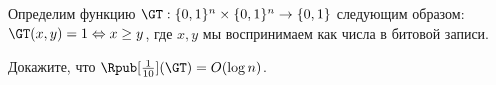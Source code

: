 Определим функцию $\GT: \{0, 1\}^n \times \{0, 1\}^n \to \{0, 1\}$ следующим образом: $\GT(x, y) = 1
\Leftrightarrow x \ge y$, где $x, y$ мы воспринимаем как числа в битовой записи.

Докажите, что $\Rpub[\frac{1}{10}](\GT) = O(\log n)$.